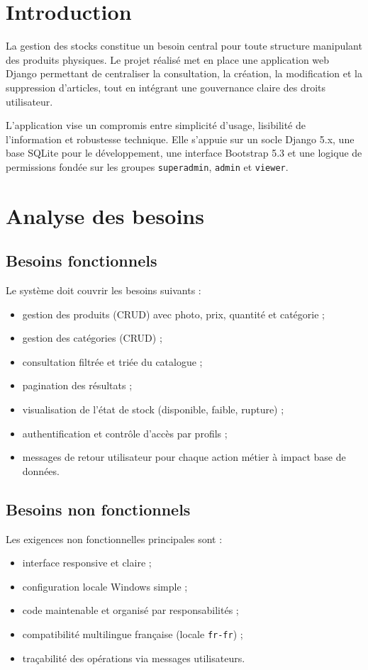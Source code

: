 \documentclass[11pt,a4paper]{article}
\begin{document}
\clearpage
{}
\setcounter{page}{1}

\tableofcontents
\newpage

\section{Introduction}
La gestion des stocks constitue un besoin central pour toute structure manipulant des produits physiques. Le projet r\'ealis\'e met en place une application web Django permettant de centraliser la consultation, la cr\'eation, la modification et la suppression d'articles, tout en int\'egrant une gouvernance claire des droits utilisateur.

L'application vise un compromis entre simplicit\'e d'usage, lisibilit\'e de l'information et robustesse technique. Elle s'appuie sur un socle Django 5.x, une base SQLite pour le d\'eveloppement, une interface Bootstrap 5.3 et une logique de permissions fond\'ee sur les groupes \texttt{superadmin}, \texttt{admin} et \texttt{viewer}.

\section{Analyse des besoins}
\subsection{Besoins fonctionnels}
Le syst\`eme doit couvrir les besoins suivants :
\begin{itemize}[leftmargin=1.2cm]
  \item gestion des produits (CRUD) avec photo, prix, quantit\'e et cat\'egorie ;
  \item gestion des cat\'egories (CRUD) ;
  \item consultation filtr\'ee et tri\'ee du catalogue ;
  \item pagination des r\'esultats ;
  \item visualisation de l'\'etat de stock (disponible, faible, rupture) ;
  \item authentification et contr\^ole d'acc\`es par profils ;
  \item messages de retour utilisateur pour chaque action m\'etier \`a impact base de donn\'ees.
\end{itemize}

\subsection{Besoins non fonctionnels}
Les exigences non fonctionnelles principales sont :
\begin{itemize}[leftmargin=1.2cm]
  \item interface responsive et claire ;
  \item configuration locale Windows simple ;
  \item code maintenable et organis\'e par responsabilit\'es ;
  \item compatibilit\'e multilingue fran\c caise (locale \texttt{fr-fr}) ;
  \item tra\c{c}abilit\'e des op\'erations via messages utilisateurs.
\end{itemize}
\end{document}

